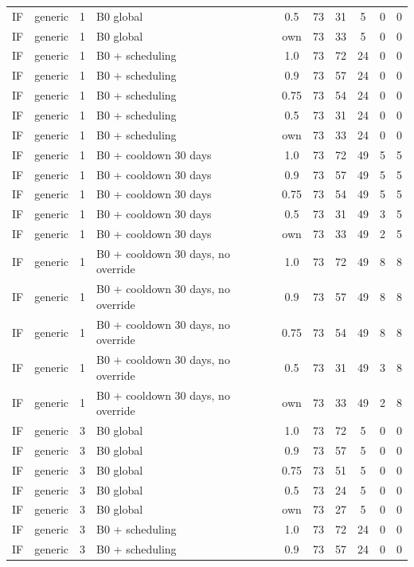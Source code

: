 \begin{longtable}{lllp{4.4cm}cccccc}
IF & generic & 1 & B0 global & 0.5 & 73 & 31 & 5 & 0 & 0 \\
IF & generic & 1 & B0 global & own & 73 & 33 & 5 & 0 & 0 \\
IF & generic & 1 & B0 + scheduling & 1.0 & 73 & 72 & 24 & 0 & 0 \\
IF & generic & 1 & B0 + scheduling & 0.9 & 73 & 57 & 24 & 0 & 0 \\
IF & generic & 1 & B0 + scheduling & 0.75 & 73 & 54 & 24 & 0 & 0 \\
IF & generic & 1 & B0 + scheduling & 0.5 & 73 & 31 & 24 & 0 & 0 \\
IF & generic & 1 & B0 + scheduling & own & 73 & 33 & 24 & 0 & 0 \\
IF & generic & 1 & B0 + cooldown 30 days & 1.0 & 73 & 72 & 49 & 5 & 5 \\
IF & generic & 1 & B0 + cooldown 30 days & 0.9 & 73 & 57 & 49 & 5 & 5 \\
IF & generic & 1 & B0 + cooldown 30 days & 0.75 & 73 & 54 & 49 & 5 & 5 \\
IF & generic & 1 & B0 + cooldown 30 days & 0.5 & 73 & 31 & 49 & 3 & 5 \\
IF & generic & 1 & B0 + cooldown 30 days & own & 73 & 33 & 49 & 2 & 5 \\
IF & generic & 1 & B0 + cooldown 30 days, no override & 1.0 & 73 & 72 & 49 & 8 & 8 \\
IF & generic & 1 & B0 + cooldown 30 days, no override & 0.9 & 73 & 57 & 49 & 8 & 8 \\
IF & generic & 1 & B0 + cooldown 30 days, no override & 0.75 & 73 & 54 & 49 & 8 & 8 \\
IF & generic & 1 & B0 + cooldown 30 days, no override & 0.5 & 73 & 31 & 49 & 3 & 8 \\
IF & generic & 1 & B0 + cooldown 30 days, no override & own & 73 & 33 & 49 & 2 & 8 \\
IF & generic & 3 & B0 global & 1.0 & 73 & 72 & 5 & 0 & 0 \\
IF & generic & 3 & B0 global & 0.9 & 73 & 57 & 5 & 0 & 0 \\
IF & generic & 3 & B0 global & 0.75 & 73 & 51 & 5 & 0 & 0 \\
IF & generic & 3 & B0 global & 0.5 & 73 & 24 & 5 & 0 & 0 \\
IF & generic & 3 & B0 global & own & 73 & 27 & 5 & 0 & 0 \\
IF & generic & 3 & B0 + scheduling & 1.0 & 73 & 72 & 24 & 0 & 0 \\
IF & generic & 3 & B0 + scheduling & 0.9 & 73 & 57 & 24 & 0 & 0 \\

\end{longtable}
